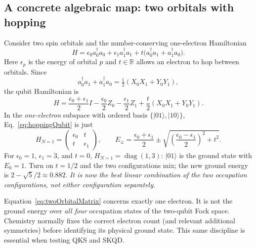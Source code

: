 \documentclass[11pt,a4paper,oneside]{report}
\newcommand{\ket}[1]{\lvert #1\rangle}
\begin{document}
\subsection{A concrete algebraic map: two orbitals with hopping}
Consider two spin orbitals and the number-conserving one-electron Hamiltonian
\begin{equation}\label{eq:hoppingFermion}
H=\epsilon_0a_0^\dagger a_0+\epsilon_1a_1^\dagger a_1
+t\bigl(a_0^\dagger a_1+a_1^\dagger a_0\bigr).
\end{equation}
Here $\epsilon_p$ is the energy of orbital $p$ and $t\in\mathbb R$ allows an electron to hop between orbitals. Since
\begin{equation}
 a_0^\dagger a_1+a_1^\dagger a_0=\tfrac12(X_0X_1+Y_0Y_1),
\end{equation}
the qubit Hamiltonian is
\begin{equation}\label{eq:hoppingQubit}
\boxed{H=\frac{\epsilon_0+\epsilon_1}{2}I
-\frac{\epsilon_0}{2}Z_0-\frac{\epsilon_1}{2}Z_1
+\frac{t}{2}(X_0X_1+Y_0Y_1).}
\end{equation}
In the \emph{one-electron} subspace with ordered basis $\{\ket{01},\ket{10}\}$, Eq.~\eqref{eq:hoppingQubit} is just
\begin{equation}\label{eq:twoOrbitalMatrix}
H_{N=1}=\begin{pmatrix}\epsilon_0&t\\t&\epsilon_1\end{pmatrix},\qquad
E_\pm=\frac{\epsilon_0+\epsilon_1}{2}\pm
\sqrt{\left(\frac{\epsilon_0-\epsilon_1}{2}\right)^2+t^2}.
\end{equation}
For $\epsilon_0=1$, $\epsilon_1=3$, and $t=0$, $H_{N=1}=\operatorname{diag}(1,3)$: $\ket{01}$ is the ground state with $E_0=1$. Turn on $t=1/2$ and the two configurations mix; the new ground energy is $2-\sqrt5/2\approx0.882$. \emph{It is now the best linear combination of the two occupation configurations, not either configuration separately.}

\begin{caution}
Equation~\eqref{eq:twoOrbitalMatrix} concerns exactly one electron. It is not the ground energy over \emph{all four} occupation states of the two-qubit Fock space. Chemistry normally fixes the correct electron count (and relevant additional symmetries) before identifying its physical ground state. This same discipline is essential when testing QKS and SKQD.
\end{caution}
\end{document}
